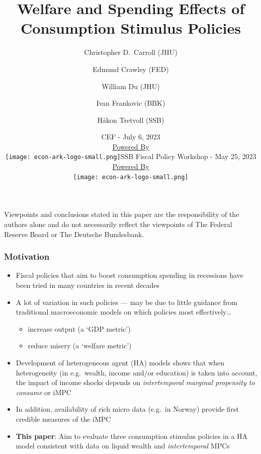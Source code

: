 \documentclass[pdflatex,aspectratio=169]{beamer}
\title[Stimulus]{Welfare and Spending Effects of Consumption Stimulus Policies}
\author{
  Christopher D.\ Carroll (JHU)
  \and
  Edmund Crawley (FED)
  \and
  William Du (JHU)
  \and
  Ivan Frankovic (BBK)
  \and
  H{\aa}kon Tretvoll (SSB)
}
\date[\today]{CEF - July 6, 2023  \\ \medskip \medskip \medskip
        \href{https://econ-ark.org/}{\small Powered By} \\ \texttt{[image: econ-ark-logo-small.png]}}}{}
\date[\today]{SSB Fiscal Policy Workshop - May 25, 2023  \\ \medskip \medskip \medskip 
          \href{https://econ-ark.org/}{\small Powered By} \\ \texttt{[image: econ-ark-logo-small.png]}}}{}
\begin{document}


\begin{frame}[plain]
  \titlepage

  \footnotesize{Viewpoints and conclusions stated in this paper are the responsibility of the authors alone
    and do not necessarily reflect the viewpoints of The Federal Reserve Board or The Deutsche Bundesbank.}
\end{frame}


\begin{frame}
  \frametitle{Motivation}
  \begin{itemize}[<+->]
    \itemsep = .5\bigskipamount
    \item
          Fiscal policies that aim to boost consumption spending in recessions have been tried in many countries in recent decades
    \item
          A lot of variation in such policies --- may be due to little guidance from traditional macroeconomic models on which policies most effectively\ldots
          \begin{itemize}
            \itemsep = .25\bigskipamount
            \item
                  increase output (a `GDP metric')
            \item
                  reduce misery (a `welfare metric')
          \end{itemize}
    \item
          Development of heterogeneous agent (HA) models shows that when heterogeneity (in e.g.\ wealth, income and/or education) is taken into account, the impact of income shocks depends on \textit{intertemporal marginal propensity to consume} or iMPC
    \item
          In addition, availability of rich micro data (e.g.\ in Norway) provide first credible measures of the iMPC
    \item
          \textbf{This paper}: Aim to evaluate three consumption stimulus policies in a HA model consistent with data on liquid wealth and \textit{intertemporal} MPCs
  \end{itemize}
\end{frame}
\end{document}
